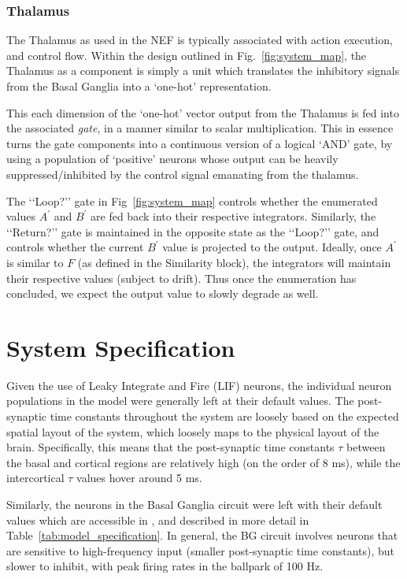\documentclass{report}
\begin{document}
\subsection{Thalamus}

The Thalamus as used in the NEF is typically associated with action execution, and control flow.
Within the design outlined in Fig.~\ref{fig:system_map}, the Thalamus as a component is simply a unit which translates the inhibitory signals from the Basal Ganglia into a \lq{}one-hot\rq{} representation.

This each dimension of the \lq{}one-hot\rq{} vector output from the Thalamus is fed into the associated \emph{gate}, in a manner similar to scalar multiplication.
This in essence turns the gate components into a continuous version of a logical \lq{}AND\rq{} gate, by using a population of \lq{}positive\rq{} neurons whose output can be  heavily suppressed/inhibited by the control signal emanating from the thalamus.

The \lq\lq{}Loop?\rq\rq{} gate in Fig~\ref{fig:system_map} controls whether the enumerated values $A^\prime$ and $B^\prime$ are fed back into their respective integrators.
Similarly, the \lq\lq{}Return?\rq\rq{} gate is maintained in the opposite state as the \lq\lq{}Loop?\rq\rq{} gate, and controls whether the current $B^\prime$ value is projected to the output.
Ideally, once $A^\prime$ is similar to $F$ (as defined in the Similarity block), the integrators will maintain their respective values (subject to drift).
Thus once the enumeration has concluded, we expect the output value to slowly degrade as well.


\chapter{System Specification}

Given the use of Leaky Integrate and Fire (LIF) neurons, the individual neuron populations in the model were generally left at their default values. 
The post-synaptic time constants throughout the system are loosely based on the expected spatial layout of the system, which loosely maps to the physical layout of the brain.
Specifically, this means that the post-synaptic time constants $\tau$ between the basal and cortical regions are relatively high (on the order of 8 ms), while the intercortical $\tau$ values hover around 5 ms.

Similarly, the neurons in the Basal Ganglia circuit were left with their default values which are accessible in \cite{bekolay2014}, and described in more detail in Table~\ref{tab:model_specification}.
In general, the BG circuit involves neurons that are sensitive to high-frequency input (smaller post-synaptic time constants), but slower to inhibit, with peak firing rates in the ballpark of 100 Hz.
\end{document}
